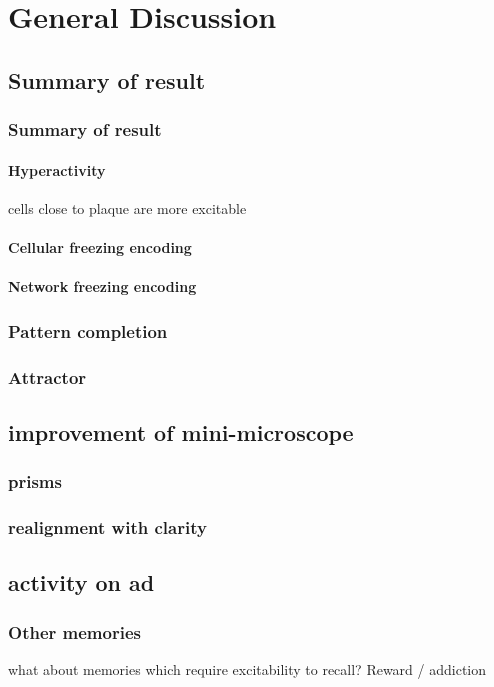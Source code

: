 \chapter{General Discussion}
\section{Summary of result}
\subsection{Summary of result}
\subsubsection{Hyperactivity}
    \citep{busche12} cells close to plaque are more excitable
\subsubsection{Cellular freezing encoding}
\subsubsection{Network freezing encoding}
\subsection{Pattern completion}
\subsection{Attractor}
\section{improvement of mini-microscope}
\subsection{prisms}
\subsection{realignment with clarity}
\section{activity on \gls{ad}}
\subsection{Other memories}
what about memories which require excitability to recall?
Reward / addiction
